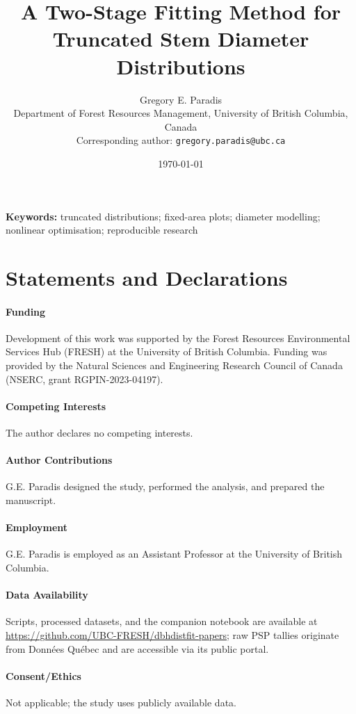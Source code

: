 \documentclass[12pt]{article}
\title{A Two-Stage Fitting Method for Truncated Stem Diameter Distributions}
\author{Gregory E. Paradis\\Department of Forest Resources Management, University of British Columbia, Canada\\Corresponding author: \texttt{gregory.paradis@ubc.ca}}
\date{\today}
\begin{document}
\maketitle

\noindent\textbf{Keywords:} truncated distributions; fixed-area plots; diameter modelling; nonlinear optimisation; reproducible research








\section*{Statements and Declarations}
\paragraph{Funding} Development of this work was supported by the Forest Resources Environmental Services Hub (FRESH) at the University of British Columbia. Funding was provided by the Natural Sciences and Engineering Research Council of Canada (NSERC, grant RGPIN-2023-04197).
\paragraph{Competing Interests} The author declares no competing interests.
\paragraph{Author Contributions} G.E. Paradis designed the study, performed the analysis, and prepared the manuscript.
\paragraph{Employment} G.E. Paradis is employed as an Assistant Professor at the University of British Columbia.
\paragraph{Data Availability} Scripts, processed datasets, and the companion notebook are available at \url{https://github.com/UBC-FRESH/dbhdistfit-papers}; raw PSP tallies originate from Donn\'ees Qu\'ebec and are accessible via its public portal.
\paragraph{Consent/Ethics} Not applicable; the study uses publicly available data.
\end{document}
